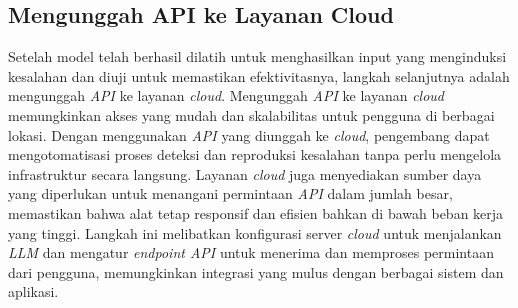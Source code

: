 



\subsection{Mengunggah API ke Layanan Cloud}
\label{sec:mengunggah api}

Setelah model telah berhasil dilatih untuk menghasilkan 
input yang menginduksi kesalahan dan diuji untuk memastikan 
efektivitasnya, langkah selanjutnya adalah mengunggah 
\emph{API} ke layanan \emph{cloud}. Mengunggah \emph{API} 
ke layanan \emph{cloud} memungkinkan akses yang mudah dan 
skalabilitas untuk pengguna di berbagai lokasi. Dengan 
menggunakan \emph{API} yang diunggah ke \emph{cloud}, 
pengembang dapat mengotomatisasi proses deteksi dan 
reproduksi kesalahan tanpa perlu mengelola infrastruktur 
secara langsung. Layanan \emph{cloud} juga menyediakan 
sumber daya yang diperlukan untuk menangani permintaan 
\emph{API} dalam jumlah besar, memastikan bahwa alat 
tetap responsif dan efisien bahkan di bawah beban kerja 
yang tinggi. Langkah ini melibatkan konfigurasi server 
\emph{cloud} untuk menjalankan \emph{LLM} dan mengatur 
\emph{endpoint API} untuk menerima dan memproses permintaan 
dari pengguna, memungkinkan integrasi yang mulus dengan 
berbagai sistem dan aplikasi.
